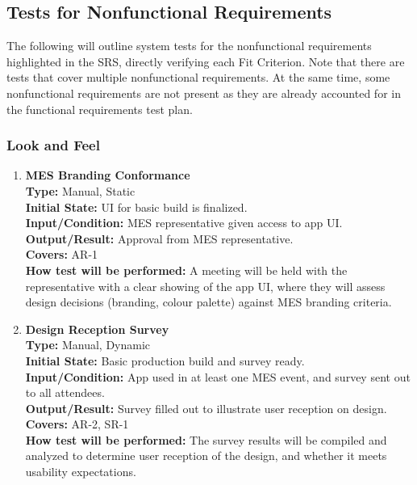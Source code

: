 \documentclass[12pt, titlepage]{article}
\begin{document}
\subsection{Tests for Nonfunctional Requirements}

The following will outline system tests for the nonfunctional requirements highlighted in the SRS, directly verifying each Fit Criterion. Note that there are tests that cover multiple nonfunctional requirements. At the same time, some nonfunctional requirements are not present as they are already accounted for in the functional requirements test plan. 

\subsubsection{Look and Feel}
\begin{enumerate}[label=\bfseries LF-\arabic*:, wide=0pt]
  \item \label{test-LF1} \textbf{MES Branding Conformance}\\[2mm]
    {\bf Type:} Manual, Static\\
    {\bf Initial State:} UI for basic build is finalized.\\
    {\bf Input/Condition:} MES representative given access to app UI.\\
    {\bf Output/Result:} Approval from MES representative.\\
    {\bf Covers:} AR-1\\
    {\bf How test will be performed:} A meeting will be held with the representative with a clear showing of the app UI, where they will assess design decisions (branding, colour palette) against MES branding criteria.
  
  \item \label{test-LF2} \textbf{Design Reception Survey}\\[2mm]
    {\bf Type:} Manual, Dynamic\\
    {\bf Initial State:} Basic production build and survey ready.\\
    {\bf Input/Condition:} App used in at least one MES event, and survey sent out to all attendees.\\
    {\bf Output/Result:} Survey filled out to illustrate user reception on design.\\
    {\bf Covers:} AR-2, SR-1\\
    {\bf How test will be performed:} The survey results will be compiled and analyzed to determine user reception of the design, and whether it meets usability expectations.


\end{enumerate}
\end{document}
